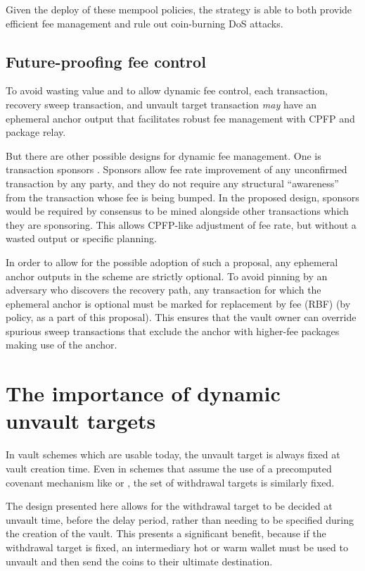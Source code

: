 \documentclass[10pt]{article}
\begin{document}
Given the deploy of these mempool policies, the \opv{} strategy is able to both
provide efficient fee management and rule out coin-burning DoS attacks.

\subsection*{Future-proofing fee control}

To avoid wasting value and to allow dynamic fee control, each \opuv{} transaction,
recovery sweep transaction, and unvault target transaction \emph{may} have an ephemeral
anchor output that facilitates robust fee management with CPFP and package relay.

But there are other possible designs for dynamic fee management. One is transaction
sponsors \cite{Sponsors}. Sponsors allow fee rate improvement of any unconfirmed
transaction by any party, and they do not require any structural ``awareness'' from the
transaction whose fee is being bumped. In the proposed design, sponsors would be
required by consensus to be mined alongside other transactions which they are
sponsoring. This allows CPFP-like adjustment of fee rate, but without a wasted output
or specific planning.

In order to allow for the possible adoption of such a proposal, any ephemeral anchor
outputs in the \opv{} scheme are strictly optional. To avoid pinning by an adversary
who discovers the recovery path, any transaction for which the ephemeral anchor is
optional must be marked for replacement by fee (RBF) (by policy, as a part of this
proposal). This ensures that the vault owner can override spurious sweep transactions
that exclude the anchor with higher-fee packages making use of the anchor.

\section*{The importance of dynamic unvault targets}

In vault schemes which are usable today, the unvault target is always fixed at vault
creation time. Even in schemes that assume the use of a precomputed covenant mechanism
like  or , the set of withdrawal targets is
similarly fixed.

The design presented here allows for the withdrawal target to be decided at unvault
time, before the delay period, rather than needing to be specified during the creation
of the vault. This presents a significant benefit, because if the withdrawal target is
fixed, an intermediary hot or warm wallet must be used to unvault and then send the
coins to their ultimate destination.
\end{document}
